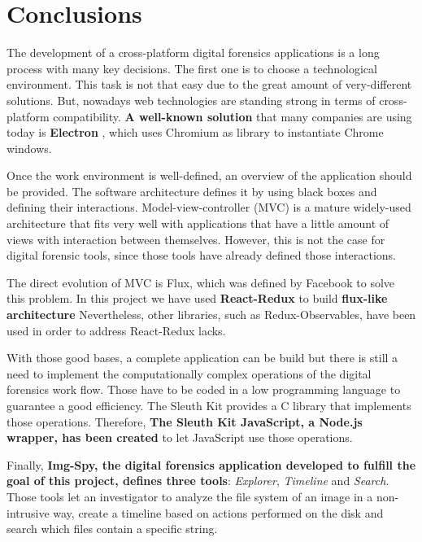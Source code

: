 \cleardoublepage
{}
\chapter*{Conclusions}

The development of a cross-platform digital forensics applications is a long
process with many key decisions. The first one is to choose a technological
environment. This task is not that easy due to the great amount of very-different solutions. But, nowadays web technologies are standing strong in
terms of cross-platform compatibility. \textbf{A well-known solution} that many
companies are using today is \textbf{Electron} \cite{electron-web}, which uses
Chromium as library to instantiate Chrome windows. 

Once the work environment is well-defined, an overview of the application 
should be provided. The software architecture defines it by using black boxes
and defining their interactions. Model-view-controller (MVC) is a mature
widely-used architecture that fits very well with applications that have a
little amount of views with interaction between themselves. However, this is not the
case for digital forensic tools, since those tools have already defined those interactions.

The direct evolution of MVC is Flux, which was defined by Facebook to solve this
problem. In this project we have used \textbf{React-Redux} to build \textbf{flux-like architecture}
Nevertheless, other libraries, such as
Redux-Observables, have been used in order to address React-Redux lacks.

With those good bases, a complete application can be build but there is still a need to implement the
computationally complex operations of the digital forensics work flow. Those have to be coded in a low programming
language to guarantee a good efficiency. The Sleuth Kit provides a C library
that implements those operations. Therefore, \textbf{The Sleuth Kit JavaScript,
a Node.js wrapper, has been created} to let JavaScript use those operations.

Finally, \textbf{Img-Spy, the digital forensics application developed to fulfill
the goal of this project, defines three tools}: \textit{Explorer},
\textit{Timeline} and \textit{Search}. Those tools let an investigator to analyze
the file system of an image in a non-intrusive way, create a timeline based on
actions performed on the disk and search which files contain a specific string.

